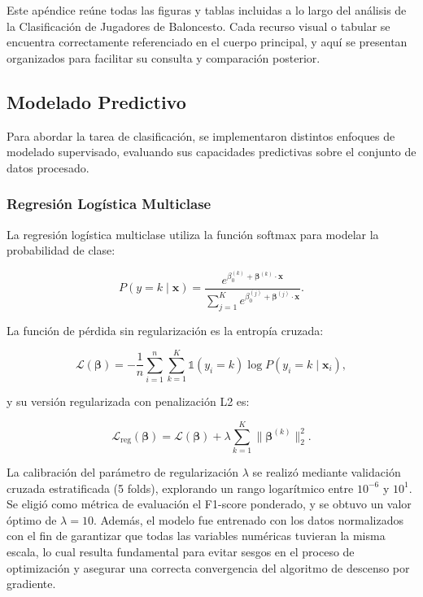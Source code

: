 Este apéndice reúne todas las figuras y tablas incluidas a lo largo del análisis de la Clasificación de Jugadores de Baloncesto. Cada recurso visual o tabular se encuentra correctamente referenciado en el cuerpo principal, y aquí se presentan organizados para facilitar su consulta y comparación posterior.



\subsection{Modelado Predictivo}\label{subsec:modelado-predictivo-p2}


Para abordar la tarea de clasificación, se implementaron distintos enfoques de modelado supervisado, evaluando sus capacidades predictivas sobre el conjunto de datos procesado.

\subsubsection{Regresión Logística Multiclase}
La regresión logística multiclase utiliza la función softmax para modelar la probabilidad de clase:

\begin{equation}
P(y = k \mid \mathbf{x}) = \frac{e^{\beta_0^{(k)} + \boldsymbol{\beta}^{(k)} \cdot \mathbf{x}}}{\sum_{j=1}^{K} e^{\beta_0^{(j)} + \boldsymbol{\beta}^{(j)} \cdot \mathbf{x}}}.
\end{equation}

La función de pérdida sin regularización es la entropía cruzada:

\begin{equation}
\mathcal{L}(\boldsymbol{\beta}) = -\frac{1}{n} \sum_{i=1}^{n} \sum_{k=1}^{K} \mathbb{1}(y_i = k) \log P(y_i = k \mid \mathbf{x}_i),
\end{equation}

y su versión regularizada con penalización L2 es:

\begin{equation}
\mathcal{L}_{\text{reg}}(\boldsymbol{\beta}) = \mathcal{L}(\boldsymbol{\beta}) + \lambda \sum_{k=1}^{K} \|\boldsymbol{\beta}^{(k)}\|_2^2.
\end{equation}

La calibración del parámetro de regularización \(\lambda\) se realizó mediante validación cruzada estratificada (5 folds), explorando un rango logarítmico entre \(10^{-6}\) y \(10^1\). Se eligió como métrica de evaluación el F1-score ponderado, y se obtuvo un valor óptimo de \(\lambda = 10\). Además, el modelo fue entrenado con los datos normalizados con el fin de garantizar que todas las variables numéricas tuvieran la misma escala, lo cual resulta fundamental para evitar sesgos en el proceso de optimización y asegurar una correcta convergencia del algoritmo de descenso por gradiente.

